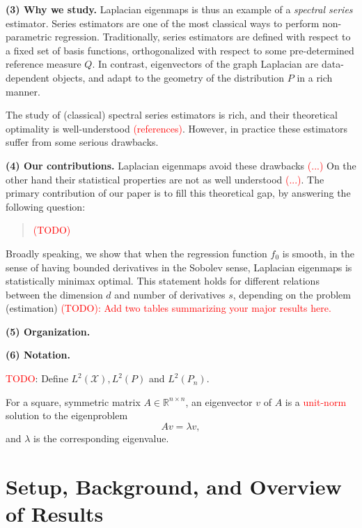 \documentclass{article}
\newcommand{\Reals}{\mathbb{R}}
\newcommand{\1}{\mathbf{1}}
\newcommand{\Leb}{L}
\newcommand{\mc}[1]{\mathcal{#1}}
\theoremstyle{alden}
\theoremstyle{aldenthm}
\theoremstyle{definition}
\theoremstyle{remark}
\begin{document}
\textbf{(3) Why we study.} Laplacian eigenmaps is thus an example of a \emph{spectral series} estimator. Series estimators are one of the most classical ways to perform non-parametric regression. Traditionally, series estimators are defined with respect to a fixed set of basis functions, orthogonalized with respect to some pre-determined reference measure $Q$. In contrast, eigenvectors of the graph Laplacian are data-dependent objects, and adapt to the geometry of the distribution $P$ in a rich manner. 

The study of (classical) spectral series estimators is rich, and their theoretical optimality is well-understood \textcolor{red}{(references)}. However, in practice these estimators suffer from some serious drawbacks.

\textbf{(4) Our contributions.} Laplacian eigenmaps avoid these drawbacks \textcolor{red}{(...)} On the other hand their statistical properties are not as well understood \textcolor{red}{(...)}. The primary contribution of our paper is to fill this theoretical gap, by answering the following question:

\begin{quote}
	\textcolor{red}{(TODO)}
\end{quote}

Broadly speaking, we show that when the regression function $f_0$ is smooth, in the sense of having bounded derivatives in the Sobolev sense, Laplacian eigenmaps is statistically minimax optimal. This statement holds for different relations between the dimension $d$ and number of derivatives $s$, depending on the problem (estimation) \textcolor{red}{(TODO): Add two tables summarizing your major results here.} 

\textbf{(5) Organization.}

\textbf{(6) Notation.}

\textcolor{red}{TODO}: Define $\Leb^2(\mc{X}), \Leb^2(P)$ and $\Leb^2(P_n)$. 


For a square, symmetric matrix $A \in \Reals^{n \times n}$, an eigenvector $v$ of $A$ is a \textcolor{red}{unit-norm} solution to the eigenproblem
\begin{equation*}
Av = \lambda v,
\end{equation*}
and $\lambda$ is the corresponding eigenvalue.

\section{Setup, Background, and Overview of Results}
\label{sec:setup_main_results}
\end{document}
